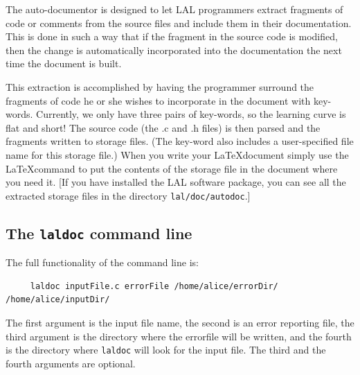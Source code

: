 \documentclass[oneside]{book}
\begin{document}
{{{{The auto-documentor is designed to let LAL programmers extract
fragments of code or comments from the source files and include them
in their documentation.  This is done in such a way that if the
fragment in the source code is modified, then the change is
automatically incorporated into the documentation the next time the
document is built.  

This extraction is  accomplished by having the programmer surround the
fragments of code he or she wishes to incorporate in the document with
key-words.  Currently, we only have three pairs of key-words, so the
learning curve is flat and short! The source code (the .c and .h
files) is then parsed and the fragments written to storage files.
(The key-word also includes a user-specified file name for this
storage file.)  When you write your \LaTeX document simply use the
\LaTeX command \verb@@ to put the contents of the storage file
in the document where you need it.  [If you have installed the LAL
software package, you can see all the extracted storage files in the
directory {\tt lal/doc/autodoc}.]

\subsection{ The {\texttt {laldoc}} command line }
The full functionality of the command line is:
\begin{verbatim}
     laldoc inputFile.c errorFile /home/alice/errorDir/ /home/alice/inputDir/
\end{verbatim}
\noindent
The first argument is the input file name, the second is an error reporting
file, the third argument is the directory where the errorfile will be
written, and the fourth is the directory where {\tt laldoc} will look
for the input file.  The third and the fourth arguments are optional.


}}}}
\end{document}

